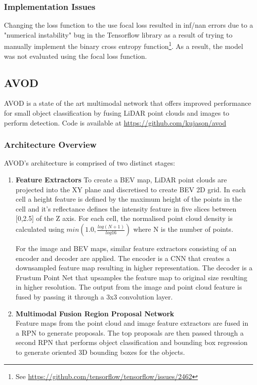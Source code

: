 \subsubsection{Implementation Issues} 
Changing the loss function to the use focal loss resulted in inf/nan errors due to a "numerical instability" bug in the Tensorflow library as a result of trying to manually implement the binary cross entropy function\footnote{See \url{https://github.com/tensorflow/tensorflow/issues/2462}}.
As a result, the model was not evaluated using the focal loss function. 
 
\subsection{AVOD}
AVOD is a state of the art multimodal network that offers improved performance for small object classification by fusing LiDAR point clouds and images to perform detection. 
Code is available at \url{https://github.com/kujason/avod}
\subsubsection{Architecture Overview}
AVOD's architecture is comprised of two distinct stages: 
\begin{enumerate}
	\item \textbf{Feature Extractors } 
	To create a BEV map, LiDAR point clouds are projected into the XY plane and discretised to create BEV 2D grid. In each cell a height feature is defined by the maximum height of the points in the cell and it's reflectance defines the intensity feature in five slices between [0,2.5] of the Z axis. For each cell, the normalised point cloud density is calculated using $min(1.0, \frac{log(N +1)}{log 16} )$ where N is the number of points. 
	
	For the image and BEV maps, similar feature extractors consisting of an encoder and decoder are applied. The encoder is a CNN that creates a downsampled feature map resulting in higher representation. The decoder is a Frustum Point Net that upsamples the  feature map to original size resulting in higher resolution. The output from the image and point cloud feature is fused by passing it through a 3x3 convolution layer. 
	\item \textbf{Multimodal Fusion Region Proposal Network} \\ 
	Feature maps from the point cloud and image feature extractors are fused in a RPN to generate proposals. The top proposals are then passed through a second RPN that performs object classification and bounding box regression to generate  oriented 3D bounding boxes for the objects.
\end{enumerate}

